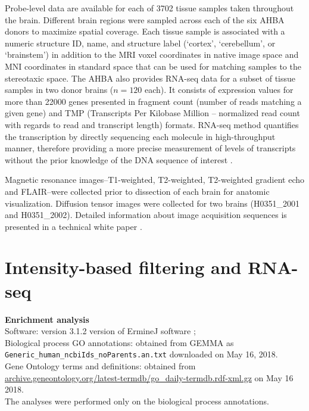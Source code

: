 Probe-level data are available for each of \num{3702} tissue samples taken throughout the brain. Different brain regions were sampled across each of the six AHBA donors to maximize spatial coverage. Each tissue sample is associated with a numeric structure ID, name, and structure label (`cortex', `cerebellum', or `brainstem') in addition to the MRI voxel coordinates in native image space and MNI coordinates in standard space that can be used for matching samples to the stereotaxic space. The AHBA also provides RNA-seq data for a subset of tissue samples in two donor brains ($n=120$ each). It consists of expression values for more than \num{22000} genes presented in fragment count (number of reads matching a given gene) and TMP (Transcripts Per Kilobase Million -- normalized read count with regards to read and transcript length) formats. RNA-seq method quantifies the transcription by directly sequencing each molecule in high-throughput manner, therefore providing a more precise measurement of levels of transcripts without the prior knowledge of the DNA sequence of interest \citep{Wang2009}.

Magnetic resonance images--T1-weighted, T2-weighted, T2-weighted gradient echo and FLAIR--were collected prior to dissection of each brain for anatomic visualization. Diffusion tensor images were collected for two brains (H0351\_2001 and H0351\_2002). Detailed information about image acquisition sequences is presented in a technical white paper \citep{AHBAdoc}.


\section{Intensity-based filtering and RNA-seq}
\label{app:AppendixCh4_2}

\textbf{Enrichment analysis} \\
\noindent Software: version 3.1.2 version of ErmineJ software \citep{Gillis2010};\\
Biological process GO annotations: obtained from GEMMA \citep{Zoubarev2012} as \\
\texttt{Generic\_human\_ncbiIds\_noParents.an.txt} downloaded on May 16, 2018. \\
Gene Ontology terms and definitions: obtained from \url{archive.geneontology.org/latest-termdb/go_daily-termdb.rdf-xml.gz} on May 16 2018.\\
The analyses were performed only on the biological process annotations. \\

